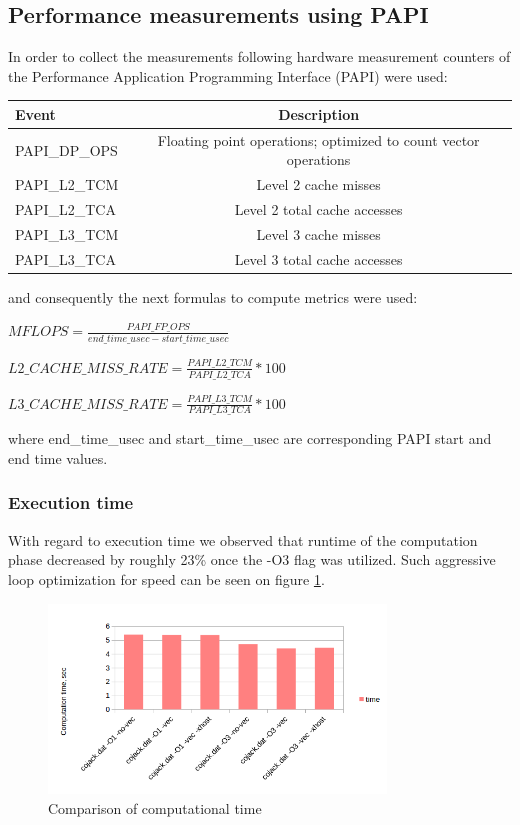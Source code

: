 \documentclass{article}
\begin{document}
\subsection{Performance measurements using PAPI}
In order to collect the measurements following hardware measurement counters of the Performance Application Programming Interface (PAPI) were used:\\
\begin{center}
\begin{tabular}{l|c}
	\hline
	Event & Description \\
	\hline
	PAPI\_DP\_OPS & Floating point operations; optimized to count vector operations \\
	PAPI\_L2\_TCM & Level 2 cache misses \\
	PAPI\_L2\_TCA & Level 2 total cache accesses \\
	PAPI\_L3\_TCM & Level 3 cache misses \\
	PAPI\_L3\_TCA & Level 3 total cache accesses \\
\end{tabular}
\end{center}
and consequently the next formulas to compute metrics were used:
\begin{center}
	$MFLOPS=\frac{PAPI\_FP\_OPS}{end\_time\_usec - start\_time\_usec}$
\end{center}
\begin{center}
	$L2\_CACHE\_MISS\_RATE=\frac{PAPI\_L2\_TCM}{PAPI\_L2\_TCA}*100$
\end{center}
\begin{center}
	$L3\_CACHE\_MISS\_RATE=\frac{PAPI\_L3\_TCM}{PAPI\_L3\_TCA}*100$
\end{center}
where end\_time\_usec and start\_time\_usec are corresponding PAPI start and end time values.

\subsubsection{Execution time}
With regard to execution time we observed that runtime of the computation phase decreased by roughly 23\% once the -O3 flag was utilized. Such aggressive loop optimization for speed can be seen on figure \ref{fig:1}.
\begin{figure}[h!]
	\begin{center}
		\includegraphics[width=0.8\textwidth]{comp-time}
		\caption{Comparison of computational time}
		\label{fig:1}
	\end{center}
\end{figure}
\end{document}
